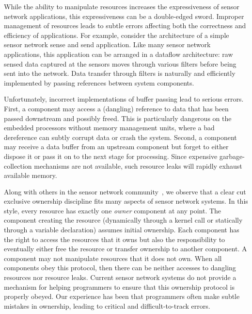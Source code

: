 While the ability to manipulate resources increases the expressiveness of
sensor network applications, this expressiveness can be a double-edged
sword.  
%
Improper management of resources leads to subtle errors affecting both the
correctness and efficiency of applications.
%
For example, consider the architecture of a simple sensor network sense and
send application.  
%
Like many sensor network applications, this application can be arranged in
a dataflow architecture:  raw sensed data captured at the sensors moves
through various filters before being sent into the network.  
%
Data transfer through filters is naturally and efficiently implemented by
passing references between system components.



Unfortunately, incorrect implementations of buffer passing lead to serious
errors.  
%
First, a component may access a (dangling) reference to data that has been
passed downstream and possibly freed.
%
This is particularly dangerous on the embedded processors without memory
management units, where a bad dereference can subtly corrupt data or crash
the system. 
%
Second, a component may receive a data buffer from an upstream component but
forget to either dispose it or pass it on to the next stage for processing.
%
Since expensive garbage-collection mechanisms are not available, such
resource leaks will rapidly exhaust available memory.



Along with others in the sensor network community~\cite{archer07interface}, we
observe that a clear cut exclusive ownership discipline fits many aspects of
sensor network systems.
%
In this style, every resource has exactly one {\em owner} component at any
point.  
%
The component creating the resource (dynamically through a kernel call or
statically through a variable declaration) assumes initial ownership.  
%
Each component has the right to access the resources that it owns but also
the responsibility to eventually either free the resource or transfer
ownership to another component.  
%
A component may not manipulate resources that it does not own.  
%
When all components obey this protocol, then there can be neither accesses
to dangling resources nor resource leaks.
%
Current sensor network systems do not provide a mechanism for helping
programmers to ensure that this ownership protocol is properly obeyed.  
%
Our experience has been that programmers often make subtle mistakes in
ownership, leading to critical and difficult-to-track errors.  



